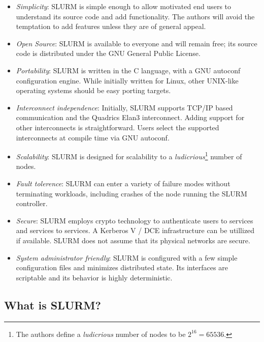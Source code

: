 \begin{itemize}
\item {\em Simplicity}: SLURM is simple enough to allow motivated end users
to understand its source code and add functionality.  The authors will 
avoid the temptation to add features unless they are of general appeal.

\item {\em Open Source}: SLURM is available to everyone and will remain free;
its source code is distributed under the GNU General Public License.

\item {\em Portability}: SLURM is written in the C language, with a GNU 
autoconf configuration engine.  While initially written for Linux, 
other UNIX-like operating systems should be easy porting targets.

\item {\em Interconnect independence}: Initially, SLURM supports TCP/IP based
communication and the Quadrics Elan3 interconnect.  Adding support for other
interconnects is straightforward.  Users select the supported interconnects
at compile time via GNU autoconf.

\item {\em Scalability}: SLURM is designed for scalability to a 
{\em ludicrious}\footnote{The authors define a {\em ludicrious} 
number of nodes to be $2^{16} = 65536$.} number of nodes.

\item {\em Fault tolerence}: SLURM can enter a variety of failure modes
without terminating workloads, including crashes of the node running the SLURM
controller.

\item {\em Secure}: SLURM employs crypto technology to authenticate 
users to services and services to services.  
A Kerberos V / DCE infrastructure can be utillized if available.
SLURM does not assume that its physical networks are secure.

\item {\em System administrator friendly}: SLURM is configured with a few
simple configuration files and minimizes distributed state.  Its interfaces
are scriptable and its behavior is highly deterministic.

\end{itemize}

\subsection{What is SLURM?}

